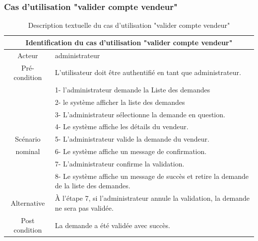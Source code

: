 \documentclass[edit,12pt,a4paper,ChapStyle,oneside,doubleinterligne]{report}
\begin{document}
\clearpage
\subsubsection{Cas d'utilisation "valider compte vendeur"}
\begin{table}[h!]
    \centering
    \begin{tabular}{|c|m{10cm}|}
    \hline
         \multicolumn{2}{|c|}{Identification du cas d'utilisation "valider compte vendeur" }\\
         \hline
         Acteur & administrateur\\
         \hline
         Pré-condition &  L'utilisateur doit être authentifié en tant que administrateur.\\
         \hline
          & 1- l'administrateur demande la Liste des demandes\\
          & 2- le système afficher la liste des demandes\\
          & 3- L'administrateur sélectionne la demande en question. \\
          & 4- Le système affiche les détails du vendeur.\\
          Scénario & 5- L'administrateur valide la demande du vendeur. \\
          nominal& 6- Le système affiche un message de confirmation.\\
          & 7- L'administrateur confirme la validation.\\
          & 8- Le système affiche un message de succès et retire la demande de la liste des demandes.\\
         \hline
         Alternative  & À l'étape 7, si l'administrateur annule la validation, la demande ne sera pas validée. \\
         \hline
         Post condition & La demande a été validée avec succès. \\
         \hline
    \end{tabular}
    \caption{Description textuelle du cas d'utilisation "valider compte vendeur" }
    \label{tab:cas 12}
\end{table}
\end{document}

